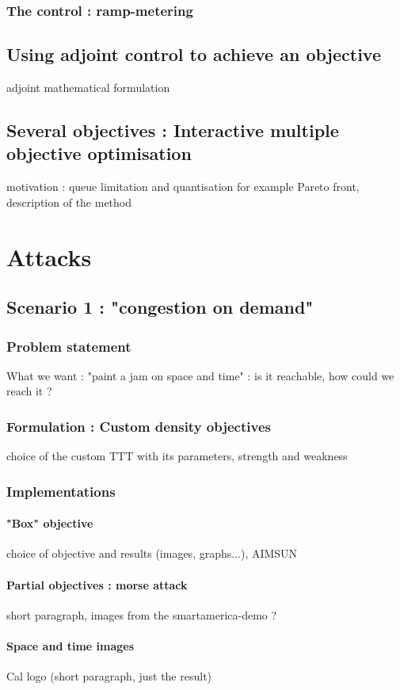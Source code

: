 \documentclass[11pt, oneside]{article}   	%
\begin{document}
		\subsubsection{The control : ramp-metering}	
	\subsection{Using adjoint control to achieve an objective}
		adjoint mathematical formulation
	\subsection{Several objectives : Interactive multiple objective optimisation}
		motivation : queue limitation and quantisation for example
		Pareto front, description of the method
		
\section{Attacks}
	\subsection{Scenario 1 : "congestion on demand"}
		\subsubsection{Problem statement}
			What we want : "paint a jam on space and time" : is it reachable, how could we reach it ?
		\subsubsection{Formulation : Custom density objectives}
			choice of the custom TTT with its parameters, strength and weakness
		\subsubsection{Implementations}
			\paragraph{"Box" objective}
				choice of objective and results (images, graphs...), AIMSUN
			\paragraph{Partial objectives : morse attack}
				short paragraph, images from the smartamerica-demo ?
			\paragraph{Space and time images}
				Cal logo (short paragraph, just the result)
\end{document}
